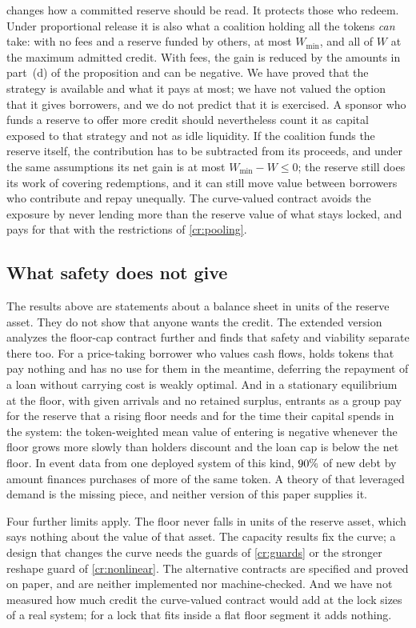  changes how a committed reserve should be read. It protects those who redeem. Under proportional release it is also what a coalition holding all the tokens \emph{can} take: with no fees and a reserve funded by others, at most $W_{\min}$, and all of $W$ at the maximum admitted credit. With fees, the gain is reduced by the amounts in part~(d) of the proposition and can be negative. We have proved that the strategy is available and what it pays at most; we have not valued the option that it gives borrowers, and we do not predict that it is exercised. A sponsor who funds a reserve to offer more credit should nevertheless count it as capital exposed to that strategy and not as idle liquidity. If the coalition funds the reserve itself, the contribution has to be subtracted from its proceeds, and under the same assumptions its net gain is at most $W_{\min}-W\le0$; the reserve still does its work of covering redemptions, and it can still move value between borrowers who contribute and repay unequally. The curve-valued contract avoids the exposure by never lending more than the reserve value of what stays locked, and pays for that with the restrictions of \cref{cr:pooling}.

\subsection{What safety does not give}

The results above are statements about a balance sheet in units of the reserve asset. They do not show that anyone wants the credit. The extended version \citep{extended} analyzes the floor-cap contract further and finds that safety and viability separate there too. For a price-taking borrower who values cash flows, holds tokens that pay nothing and has no use for them in the meantime, deferring the repayment of a loan without carrying cost is weakly optimal. And in a stationary equilibrium at the floor, with given arrivals and no retained surplus, entrants as a group pay for the reserve that a rising floor needs and for the time their capital spends in the system: the token-weighted mean value of entering is negative whenever the floor grows more slowly than holders discount and the loan cap is below the net floor. In event data from one deployed system of this kind, $90\%$ of new debt by amount finances purchases of more of the same token. A theory of that leveraged demand is the missing piece, and neither version of this paper supplies it.

Four further limits apply. The floor never falls in units of the reserve asset, which says nothing about the value of that asset. The capacity results fix the curve; a design that changes the curve needs the guards of \cref{cr:guards} or the stronger reshape guard of \cref{cr:nonlinear}. The alternative contracts are specified and proved on paper, and are neither implemented nor machine-checked. And we have not measured how much credit the curve-valued contract would add at the lock sizes of a real system; for a lock that fits inside a flat floor segment it adds nothing.

